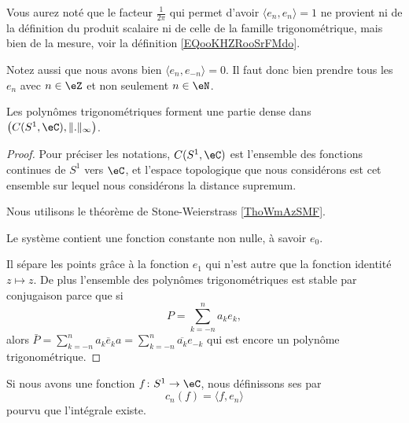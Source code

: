 \begin{remark}
    Vous aurez noté que le facteur \( \frac{1}{ 2\pi }\) qui permet d'avoir \( \langle e_n, e_n\rangle=1 \) ne provient ni de la définition du produit scalaire ni de celle de la famille trigonométrique, mais bien de la mesure, voir la définition \ref{EQooKHZRooSrFMdo}.
\end{remark}

\begin{remark}      \label{REMooUCANooVyXPxj}
    Notez aussi que nous avons bien \( \langle e_n, e_{-n}\rangle =0\). Il faut donc bien prendre tous les \( e_n\) avec \( n\in \eZ\) et non seulement \( n\in \eN\).
\end{remark}

\begin{proposition}     \label{PROPooTGBHooXGhdPR}
    Les polynômes trigonométriques forment une partie dense dans \( \big( C(S^1,\eC),\| . \|_{\infty} \big)\).
\end{proposition}

\begin{proof}
    Pour préciser les notations, \( C(S^1,\eC)\) est l'ensemble des fonctions continues de \( S^1\) vers \( \eC\), et l'espace topologique que nous considérons est cet ensemble sur lequel nous considérons la distance supremum.

    Nous utilisons le théorème de Stone-Weierstrass \ref{ThoWmAzSMF}.

    Le système contient une fonction constante non nulle, à savoir \( e_0\).

    Il sépare les points grâce à la fonction \( e_1\) qui n'est autre que la fonction identité \( z\mapsto z\). De plus l'ensemble des polynômes trigonométriques est stable par conjugaison parce que si
    \begin{equation}
        P=\sum_{k=-n}^na_ke_k,
    \end{equation}
    alors \( \bar P=\sum_{k=-n}^n\overline{ a_k e_ka}=\sum_{k=-n}^n\overline{ a_k }e_{-k}\) qui est encore un polynôme trigonométrique.
\end{proof}

\begin{definition}
    Si nous avons une fonction \( f\colon S^1\to \eC\), nous définissons ses  par
    \begin{equation}
        c_n(f)=\langle f, e_n\rangle 
    \end{equation}
    pourvu que l'intégrale existe.
\end{definition}

